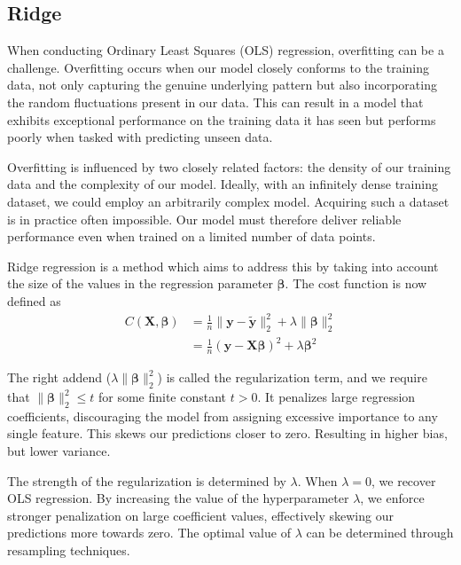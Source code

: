 \documentclass{article}
\begin{document}
\subsection{Ridge}
When conducting Ordinary Least Squares (OLS) regression, overfitting can be a challenge. Overfitting occurs when our model closely conforms to the training data, not only capturing the genuine underlying pattern but also incorporating the random fluctuations present in our data. This can result in a model that exhibits exceptional performance on the training data it has seen but performs poorly when tasked with predicting unseen data.

Overfitting is influenced by two closely related factors: the density of our training data and the complexity of our model. Ideally, with an infinitely dense training dataset, we could employ an arbitrarily complex model. Acquiring such a dataset is in practice often impossible. Our model must therefore deliver reliable performance even when trained on a limited number of data points.

Ridge regression is a method which aims to address this by taking into account the size of the values in the regression parameter $\boldsymbol{\beta}$. The cost function is now defined as
\begin{align*}
    C \left( \textbf{X}, \boldsymbol{\beta} \right) &= \frac{1}{n} \lVert\boldsymbol{y} - \boldsymbol{\tilde{y}} \rVert_2^2 + \lambda \lVert \boldsymbol{\beta} \rVert_2^2 \\
    &= \frac{1}{n} \left( \boldsymbol{y} - \textbf{X} \boldsymbol{\beta} \right)^2 + \lambda \boldsymbol{\beta}^2
\end{align*}

The right addend ($\lambda\lVert \boldsymbol{\beta} \rVert_2^2$) is called the regularization term, and we require that $\lVert \boldsymbol{\beta} \rVert_2^2 \leq t$ for some finite constant $t > 0$. It penalizes large regression coefficients, discouraging the model from assigning excessive importance to any single feature. This skews our predictions closer to zero. Resulting in higher bias, but lower variance.

The strength of the regularization is determined by $\lambda$. When $\lambda=0$, we recover OLS regression. By increasing the value of the hyperparameter $\lambda$, we enforce stronger penalization on large coefficient values, effectively skewing our predictions more towards zero. The optimal value of $\lambda$ can be determined through resampling techniques.
\end{document}
